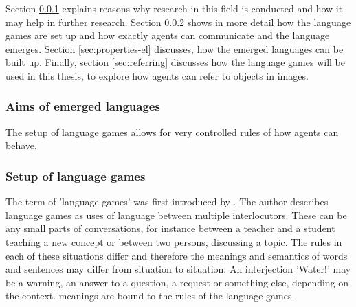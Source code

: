
Section \ref{sec:aims_languages} explains reasons why research in this field is conducted and how it may help in further research.
Section \ref{sec:setup-lg} shows in more detail how the language games are set up and how exactly agents can communicate and the language emerges.
Section \ref{sec:properties-el} discusses, how the emerged languages can be built up.
Finally, section \ref{sec:referring} discusses how the language games will be used in this thesis, to explore how agents can refer to objects in images.

\subsubsection{Aims of emerged languages}
\label{sec:aims_languages}
The setup of language games allows for very controlled rules of how agents can behave.


\subsubsection{Setup of language games}
\label{sec:setup-lg}
The term of 'language games' was first introduced by \citet{Wittgenstein1953}.
The author describes language games as uses of language between multiple interlocutors.
These can be any small parts of conversations, for instance between a teacher and a student teaching a new concept or between two persons, discussing a topic.
The rules in each of these situations differ and therefore the meanings and semantics of words and sentences may differ from situation to situation.
An interjection 'Water!' may be a warning, an answer to a question, a request or something else, depending on the context.
meanings are bound to the rules of the language games.

